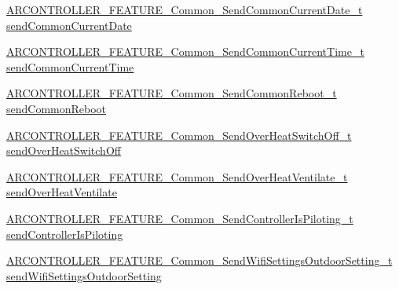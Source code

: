 \begin{DoxyCompactItemize}
\item 
\hyperlink{_a_r_c_o_n_t_r_o_l_l_e_r___feature_8h_a81036952aa2d329835cf2733ea904582}{A\+R\+C\+O\+N\+T\+R\+O\+L\+L\+E\+R\+\_\+\+F\+E\+A\+T\+U\+R\+E\+\_\+\+Common\+\_\+\+Send\+Common\+Current\+Date\+\_\+t} \hyperlink{struct_a_r_c_o_n_t_r_o_l_l_e_r___f_e_a_t_u_r_e___common__t_a43b02e21167977ac1c4a2d4176d06d32}{send\+Common\+Current\+Date}
\item 
\hyperlink{_a_r_c_o_n_t_r_o_l_l_e_r___feature_8h_a1c013ee2328f2f6160652cad1b83533b}{A\+R\+C\+O\+N\+T\+R\+O\+L\+L\+E\+R\+\_\+\+F\+E\+A\+T\+U\+R\+E\+\_\+\+Common\+\_\+\+Send\+Common\+Current\+Time\+\_\+t} \hyperlink{struct_a_r_c_o_n_t_r_o_l_l_e_r___f_e_a_t_u_r_e___common__t_ab890e2c233b45248e3e055763e86dc51}{send\+Common\+Current\+Time}
\item 
\hyperlink{_a_r_c_o_n_t_r_o_l_l_e_r___feature_8h_afa57da60804a68f0a346ac27bf5c5979}{A\+R\+C\+O\+N\+T\+R\+O\+L\+L\+E\+R\+\_\+\+F\+E\+A\+T\+U\+R\+E\+\_\+\+Common\+\_\+\+Send\+Common\+Reboot\+\_\+t} \hyperlink{struct_a_r_c_o_n_t_r_o_l_l_e_r___f_e_a_t_u_r_e___common__t_aab63c407d66f5ddbf9378bf7544ddb3b}{send\+Common\+Reboot}
\item 
\hyperlink{_a_r_c_o_n_t_r_o_l_l_e_r___feature_8h_a80b2307f2b5d3afa873b188061c8129f}{A\+R\+C\+O\+N\+T\+R\+O\+L\+L\+E\+R\+\_\+\+F\+E\+A\+T\+U\+R\+E\+\_\+\+Common\+\_\+\+Send\+Over\+Heat\+Switch\+Off\+\_\+t} \hyperlink{struct_a_r_c_o_n_t_r_o_l_l_e_r___f_e_a_t_u_r_e___common__t_a10321e6f43435f673e56e73c278adfd3}{send\+Over\+Heat\+Switch\+Off}
\item 
\hyperlink{_a_r_c_o_n_t_r_o_l_l_e_r___feature_8h_aa54f31831a8e0bfc3ff0e204dd27a3d7}{A\+R\+C\+O\+N\+T\+R\+O\+L\+L\+E\+R\+\_\+\+F\+E\+A\+T\+U\+R\+E\+\_\+\+Common\+\_\+\+Send\+Over\+Heat\+Ventilate\+\_\+t} \hyperlink{struct_a_r_c_o_n_t_r_o_l_l_e_r___f_e_a_t_u_r_e___common__t_afb6ac867320dcfc36c9dfcf934b97472}{send\+Over\+Heat\+Ventilate}
\item 
\hyperlink{_a_r_c_o_n_t_r_o_l_l_e_r___feature_8h_a9a2addf88f8b33b1a52d69f27c14bb17}{A\+R\+C\+O\+N\+T\+R\+O\+L\+L\+E\+R\+\_\+\+F\+E\+A\+T\+U\+R\+E\+\_\+\+Common\+\_\+\+Send\+Controller\+Is\+Piloting\+\_\+t} \hyperlink{struct_a_r_c_o_n_t_r_o_l_l_e_r___f_e_a_t_u_r_e___common__t_ad20e2b580e6035572fac0857b00bf5c2}{send\+Controller\+Is\+Piloting}
\item 
\hyperlink{_a_r_c_o_n_t_r_o_l_l_e_r___feature_8h_a4c1e91d00fa4bd7d00835f27adee7a83}{A\+R\+C\+O\+N\+T\+R\+O\+L\+L\+E\+R\+\_\+\+F\+E\+A\+T\+U\+R\+E\+\_\+\+Common\+\_\+\+Send\+Wifi\+Settings\+Outdoor\+Setting\+\_\+t} \hyperlink{struct_a_r_c_o_n_t_r_o_l_l_e_r___f_e_a_t_u_r_e___common__t_a0489aa699bf61c6efad58207fbea6710}{send\+Wifi\+Settings\+Outdoor\+Setting}

\end{DoxyCompactItemize}
